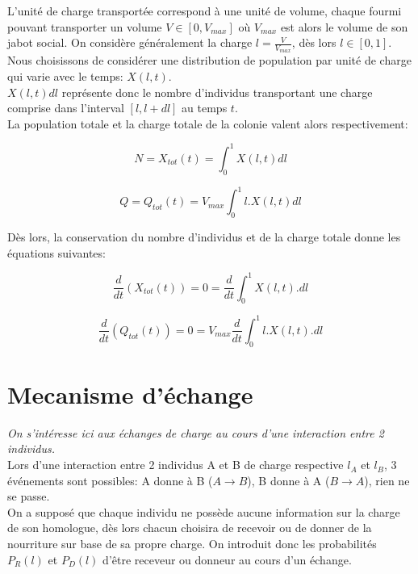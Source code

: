 L'unité de charge transportée correspond à une unité de volume, chaque fourmi pouvant transporter un volume $V\in[0,V_{max}]$ où $V_{max}$ est alors le volume de son jabot social. On considère généralement la charge $l=\frac{V}{V_{max}}$, dès lors $l\in[0,1]$.\\

Nous choisissons de considérer une distribution de population par unité de charge qui varie avec le temps: $X(l,t)$.\\
$X(l,t)dl$ représente donc le nombre d'individus transportant une charge comprise dans l'interval $[l,l+dl]$ au temps $t$.\\

La population totale et la charge totale de la colonie valent alors respectivement:

\begin{equation}
N = X_{tot}(t) = \int^1_0X(l,t) dl
\label{Xtot}
\end{equation}

\begin{equation}
Q = Q_{tot}(t) = V_{max} \int^1_0 l.X(l,t) dl
\label{Qtot}
\end{equation}


Dès lors, la conservation du nombre d'individus et de la charge totale donne les équations suivantes:

\begin{equation}
\frac{d}{d t} (X_{tot}(t)) = 0 = \frac{d}{dt}\int^1_0 X(l,t).dl
\label{ConservationXtot}
\end{equation}

\begin{equation}
\frac{d}{d t} (Q_{tot}(t)) = 0 = V_{max} \frac{d}{dt}\int^1_0 l.X(l,t).dl
\label{ConservationQtot}
\end{equation}

\section{Mecanisme d'échange}

\textit{On s'intéresse ici aux échanges de charge au cours d'une interaction entre 2 individus.}\\

Lors d'une interaction entre 2 individus A et B de charge respective $l_A$ et $l_B$, 3 événements sont possibles: A donne à B ($A \rightarrow B$), B donne à A ($B \rightarrow A$), rien ne se passe.\\

On a supposé que chaque individu ne possède aucune information sur la charge de son homologue, dès lors chacun choisira de recevoir ou de donner de la nourriture sur base de sa propre charge. On introduit donc les probabilités $P_R(l)$ et $P_D(l)$ d'être receveur ou donneur au cours d'un échange.\\


